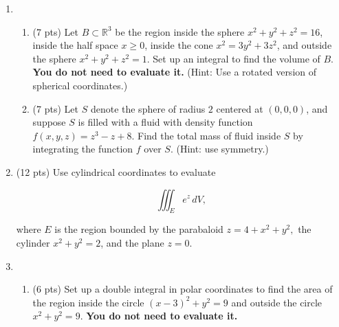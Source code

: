 \documentclass[12 pt]{report}
\begin{document}
\newpage
\begin{enumerate}

\item \begin{enumerate} 

\item (7 pts) Let $B \subset \mathbb{R}^3$ be the region inside the sphere $x^2 + y^2 + z^2 = 16$, inside the half space $x \geq 0$, inside the cone $x^2 = 3y^2 + 3z^2$, and outside the sphere $x^2 + y^2 + z^2 = 1$. Set up an integral to find the volume of $B$. \textbf{You do not need to evaluate it.} (Hint: Use a rotated version of spherical coordinates.) 

\vfill

\item (7 pts) Let $S$ denote the sphere of radius $2$ centered at $(0,0,0)$, and suppose $S$ is filled with a fluid with density function $f(x,y,z) = z^3 - z + 8$. Find the total mass of fluid inside $S$ by integrating the function $f$ over $S$. (Hint: use symmetry.)

\vfill
\end{enumerate}


\newpage


\item (12 pts) Use cylindrical coordinates to evaluate 

\[
\iiint_E e^z \, dV,
\]

where $E$ is the region bounded by the parabaloid $z = 4+x^2 + y^2,$ the cylinder $x^2+y^2 =2$, and the plane $z=0$.





%
%
%
%
%
%
%
%
%
%
%
%

\newpage

\item \begin{enumerate} \item (6 pts) Set up a double integral in polar coordinates to find the area of the region inside the circle $(x-3)^2 + y^2 = 9$ and outside the circle $x^2+y^2 = 9$. \textbf{You do not need to evaluate it.}


\end{enumerate}
\end{enumerate}
\end{document}
